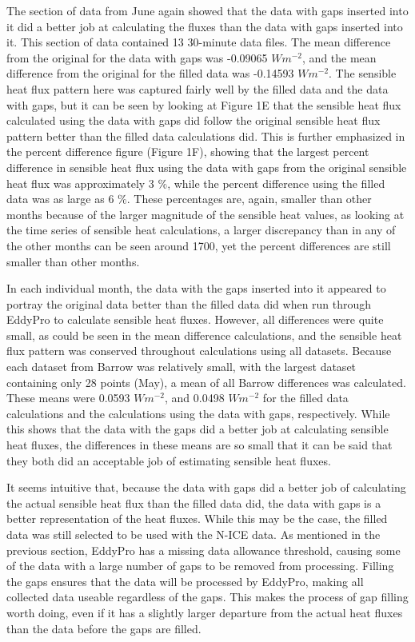 The section of data from June again showed that the data with gaps inserted into it did a better job at calculating the fluxes than the data with gaps inserted into it. This section of data contained 13 30-minute data files. The mean difference from the original for the data with gaps was -0.09065 $Wm^{-2}$, and the mean difference from the original for the filled data was -0.14593 $Wm^{-2}$. The sensible heat flux pattern here was captured fairly well by the filled data and the data with gaps, but it can be seen by looking at Figure 1E that the sensible heat flux calculated using the data with gaps did follow the original sensible heat flux pattern better than the filled data calculations did. This is further emphasized in the percent difference figure (Figure 1F), showing that the largest percent difference in sensible heat flux using the data with gaps from the original sensible heat flux was approximately 3 $\%$, while the percent difference using the filled data was as large as 6 $\%$. These percentages are, again, smaller than other months because of the larger magnitude of the sensible heat values, as looking at the time series of sensible heat calculations, a larger discrepancy than in any of the other months can be seen around 1700, yet the percent differences are still smaller than other months.

In each individual month, the data with the gaps inserted into it appeared to portray the original data better than the filled data did when run through EddyPro to calculate sensible heat fluxes. However, all differences were quite small, as could be seen in the mean difference calculations, and the sensible heat flux pattern was conserved throughout calculations using all datasets. Because each dataset from Barrow was relatively small, with the largest dataset containing only 28 points (May), a mean of all Barrow differences was calculated. These means were 0.0593 $Wm^{-2}$, and 0.0498 $Wm^{-2}$ for the filled data calculations and the calculations using the data with gaps, respectively. While this shows that the data with the gaps did a better job at calculating sensible heat fluxes, the differences in these means are so small that it can be said that they both did an acceptable job of estimating sensible heat fluxes. 

It seems intuitive that, because the data with gaps did a better job of calculating the actual sensible heat flux than the filled data did, the data with gaps is a better representation of the heat fluxes. While this may be the case, the filled data was still selected to be used with the N-ICE data. As mentioned in the previous section, EddyPro has a missing data allowance threshold, causing some of the data with a large number of gaps to be removed from processing. Filling the gaps ensures that the data will be processed by EddyPro, making all collected data useable regardless of the gaps. This makes the process of gap filling worth doing, even if it has a slightly larger departure from the actual heat fluxes than the data before the gaps are filled. 

